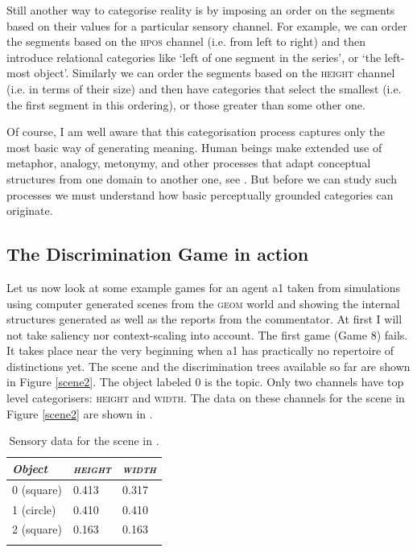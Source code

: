 Still another way to categorise reality is by imposing 
an order on the segments based on their values for 
a particular sensory channel. For example, we can 
order the segments based on the \textsc{hpos} channel (i.e. 
from left to right) and then introduce relational categories
like `left of one segment in the series', or `the left-most object'. 
Similarly we can order the segments based on the 
\textsc{height} channel (i.e. in terms of their size) and then 
have categories that select the smallest (i.e. the 
first segment in this ordering), or those greater than 
some other one. 

Of course, I am well aware that this categorisation 
process captures only the most basic way of generating
meaning. Human beings make extended use of metaphor, 
analogy, metonymy, and other processes that adapt 
conceptual structures from one domain to another one, see \cite{Johnson:1987}.
But before we can study such processes we must understand
how basic perceptually grounded categories can 
originate. 
 
\subsection{The Discrimination Game in action}

Let us now look at some example 
games for an agent {\bfshape a1} taken from simulations
using computer generated
scenes from the \textsc{geom} world and showing the internal
structures generated as well as the reports from the commentator. 
At first I will not take saliency nor 
context-scaling into account. The first game
(Game 8) fails. It takes place near the very beginning 
when {\bfshape a1} has practically 
no repertoire of distinctions yet. The scene and the 
discrimination trees available so far are shown in Figure 
\ref{scene2}. The object labeled 0 is the
topic. Only two channels have top level
categorisers: \textsc{height} and \textsc{width}. 
The data on these channels for the scene in Figure
\ref{scene2} are shown in . 

\begin{table}
\begin{center}
\begin{tabular}{ l  l  l }
\lsptoprule
{\itshape Object} & {\itshape \textsc{height}} & {\itshape \textsc{width}} \\ \midrule
0 (square) & 0.413 & 0.317  \\ 
1 (circle) & 0.410 & 0.410 \\ 
2 (square) & 0.163 & 0.163 \\ 
\lspbottomrule
\end{tabular}
\caption{\label{tab:t-game8}Sensory data for the scene in .}
\end{center}
\end{table}

